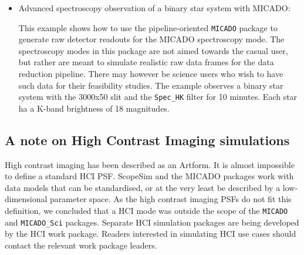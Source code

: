 \begin{itemize}
\item Advanced spectroscopy observation of a binary star system with MICADO:

This example shows how to use the pipeline-oriented \texttt{MICADO} package to generate raw detector readouts for the MICADO spectroscopy mode.
The spectroscopy modes in this package are not aimed towards the casual user, but rather are meant to simulate realistic raw data frames for the data reduction pipeline.
There may however be science users who wish to have such data for their feasibility studies.
The example observes a binary star system with the 3000x50 slit and the \texttt{Spec\_HK} filter for 10 minutes.
Each star ha a K-band brightness of 18 magnitudes.
\end{itemize}


\subsection{A note on High Contrast Imaging simulations%
  \label{a-note-on-high-contrast-imaging-simulations}%
}

High contrast imaging has been described as an Artform.
It is almost impossible to define a \textquotedbl{}standard\textquotedbl{} HCI PSF.
ScopeSim and the MICADO packages work with data models that can be standardised, or at the very least be described by a low-dimensional parameter space.
As the high contrast imaging PSFs do not fit this definition, we concluded that a HCI mode was outside the scope of the \texttt{MICADO} and \texttt{MICADO\_Sci} packages.
Separate HCI simulation packages are being developed by the HCI work package.
Readers interested in simulating HCI use cases should contact the relevant work package leaders.
